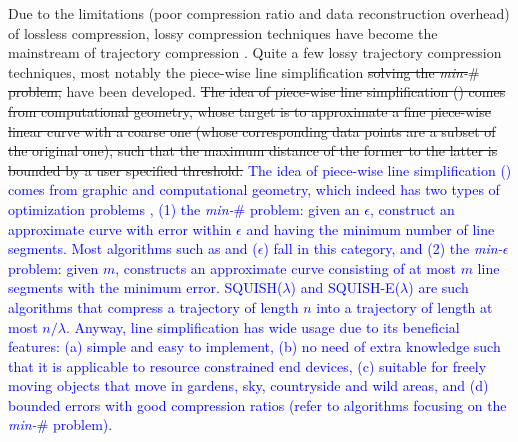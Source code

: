 Due to the  limitations (poor compression ratio and data reconstruction overhead) of lossless compression, lossy compression techniques have become the mainstream of trajectory compression \cite{Lin:Operb,Zhang:Evaluation}. Quite a few lossy trajectory compression techniques, most notably the piece-wise line simplification \cite{Douglas:Peucker, Hershberger:Speeding, Keogh:online,Liu:BQS, Muckell:Compression, Chen:Trajectory, Chen:Fast, Cao:Spatio, Shi:Survey} \sout{solving the \emph{min-$\#$} problem,} have been developed. 
\sout{The idea of piece-wise line simplification (\lsa) comes from computational geometry, whose target is to approximate a fine piece-wise linear curve with a coarse one (whose corresponding data points are a subset of the original one), such that the maximum distance of the former to the latter is bounded by a user specified threshold. }
%
\textcolor{blue}{The idea of piece-wise line simplification (\lsa) comes from graphic and computational geometry, which indeed has two types of optimization problems \cite{Chan:Optimal, Imai:Optimal,Pavlidis:Segment}, (1) the \emph{min-$\#$} problem: given an $\epsilon$, construct an approximate curve with error within $\epsilon$ and having the minimum number of line segments. Most \lsa algorithms such as \cite{Douglas:Peucker, Hershberger:Speeding, Keogh:online,Liu:BQS, Chen:Trajectory, Chen:Fast, Cao:Spatio, Shi:Survey} and \squishe($\epsilon$) \cite{Muckell:Compression} fall in this category, and } 
\textcolor{blue}{(2) the \emph{min-$\epsilon$} problem: given $m$, constructs an approximate curve consisting of at most $m$ line segments with the minimum error. SQUISH($\lambda$) \cite{Muckell:SQUISH} and SQUISH-E($\lambda$) \cite{Muckell:Compression} are such algorithms that compress a trajectory of length $n$ into a trajectory of length at most $n/\lambda$. }
\textcolor{blue}{Anyway, line simplification has wide usage due to its beneficial features: (a) simple and easy to implement, (b) no need of extra knowledge such that it is applicable to resource constrained end devices, (c) suitable for freely  moving  objects \cite{Popa:Spatio} that move in gardens, sky, countryside and wild areas, and (d) bounded errors with good compression ratios (refer to algorithms focusing on the \emph{min-$\#$} problem). }


